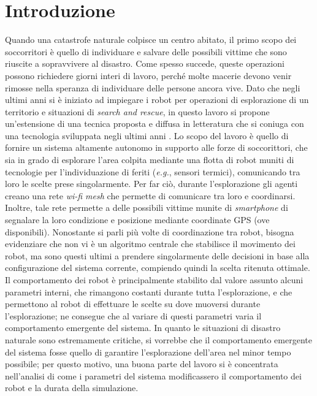 \chapter{Introduzione}
\label{introduction}
Quando una catastrofe naturale colpisce un centro abitato, il primo scopo dei soccorritori è quello di individuare e salvare delle possibili vittime che sono riuscite a sopravvivere al disastro.
Come spesso succede, queste operazioni possono richiedere giorni interi di lavoro, perché molte macerie devono venir rimosse nella speranza di individuare delle persone ancora vive.
Dato che negli ultimi anni si è iniziato ad impiegare i robot per operazioni di esplorazione di un territorio e situazioni di \textit{search and rescue}, in questo lavoro si propone un'estensione di una tecnica proposta e diffusa in letteratura \cite{burgard2005} che si coniuga con una tecnologia sviluppata negli ultimi anni \cite{OWL}.
Lo scopo del lavoro è quello di fornire un sistema altamente autonomo in supporto alle forze di soccorittori, che sia in grado di esplorare l'area colpita mediante una flotta di robot muniti di tecnologie per l'individuazione di feriti (\textit{e.g.}, sensori termici), comunicando tra loro le scelte prese singolarmente.
Per far ciò, durante l'esplorazione gli agenti creano una rete \textit{wi-fi mesh} che permette di comunicare tra loro e coordinarsi.
Inoltre, tale rete permette a delle possibili vittime munite di \textit{smartphone} di segnalare la loro condizione e posizione mediante coordinate GPS (ove disponibili).
Nonostante si parli più volte di coordinazione tra robot, bisogna evidenziare che non vi è un algoritmo centrale che stabilisce il movimento dei robot, ma sono questi ultimi a prendere singolarmente delle decisioni in base alla configurazione del sistema corrente, compiendo quindi la scelta ritenuta ottimale.
Il comportamento dei robot è principalmente stabilito dal valore assunto alcuni parametri interni, che rimangono costanti durante tutta l'esplorazione, e che permettono al robot di effettuare le scelte su dove muoversi durante l'esplorazione; ne consegue che al variare di questi parametri varia il comportamento emergente del sistema.
In quanto le situazioni di disastro naturale sono estremamente critiche, si vorrebbe che il comportamento emergente del sistema fosse quello di garantire l'esplorazione dell'area nel minor tempo possibile; per questo motivo, una buona parte del lavoro si è concentrata nell'analisi di come i parametri del sistema modificassero il comportamento dei robot e la durata della simulazione.\\
